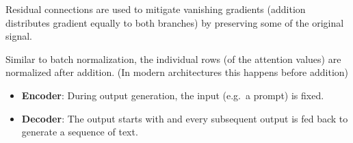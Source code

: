 \newpar{}

Residual connections are used to mitigate vanishing gradients (addition distributes gradient equally to both branches) by preserving some of the original signal.

\newpar{}

Similar to batch normalization, the individual rows (of the attention values) are normalized after addition.
(In modern architectures this happens before addition)

\newpar{}
\begin{itemize}
    \item \textbf{Encoder}: During output generation, the input (e.g.\ a prompt) is fixed.
    \item \textbf{Decoder}: The output starts with  and every subsequent output is fed back to generate a sequence of text.
\end{itemize}

\newpar{}



